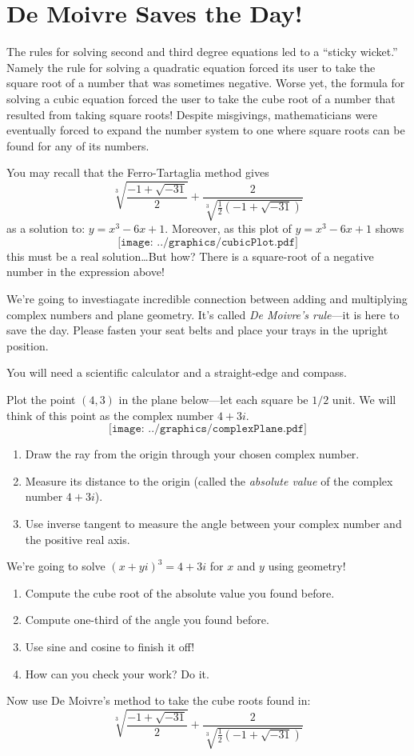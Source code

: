 \newpage
\section{De Moivre Saves the Day!}

The rules for solving second and third degree equations led to a
``sticky wicket.''  Namely the rule for solving a quadratic equation
forced its user to take the square root of a number that was sometimes
negative.  Worse yet, the formula for solving a cubic equation forced
the user to take the cube root of a number that resulted from taking
square roots!  Despite misgivings, mathematicians were eventually
forced to expand the number system to one where square roots can be
found for any of its numbers.

You may recall that the Ferro-Tartaglia method gives 
\[
\sqrt[3]{\frac{-1+\sqrt{-31}}{2}} + \frac{2}{\sqrt[3]{\frac{1}{2}(-1+\sqrt{-31})}}
\]
as a solution to: $y = x^3-6x+1$. Moreover, as this plot of $y = x^3-6x+1$ shows
\[
\texttt{[image: ../graphics/cubicPlot.pdf]}
\]
this must be a real solution\dots But how? There is a square-root of a
negative number in the expression above! 

We're going to investiagate incredible connection between adding and
multiplying complex numbers and plane geometry.  It's called \textit{De
Moivre's rule}---it is here to save the day.  Please fasten your seat
belts and place your trays in the upright position.



You will need a scientific calculator and a straight-edge and compass.

\break

\begin{prob}
Plot the point $(4,3)$ in the plane below---let each square be $1/2$
unit.  We will think of this point as the complex number $4 + 3i$.
\[
\texttt{[image: ../graphics/complexPlane.pdf]}
\]
\begin{enumerate}
\item Draw the ray from the origin through your chosen complex number.
\item Measure its distance to the origin (called the \textit{absolute value} of the complex number $4 + 3i$). 
\item Use inverse tangent to measure the angle between your complex number and the positive real axis. 
\end{enumerate}
\end{prob}

\begin{prob}
We're going to solve $(x+yi)^3 = 4+3i$ for $x$ and $y$ using geometry!
\begin{enumerate}
\item Compute the cube root of the absolute value you found before. 
\item Compute one-third of the angle you found before. 
\item Use sine and cosine to finish it off!
\item How can you check your work? Do it.
\end{enumerate}
\end{prob}


\begin{prob}
Now use De Moivre's method to take the cube roots found in:
\[
\sqrt[3]{\frac{-1+\sqrt{-31}}{2}} + \frac{2}{\sqrt[3]{\frac{1}{2}(-1+\sqrt{-31})}}
\]
\end{prob}
